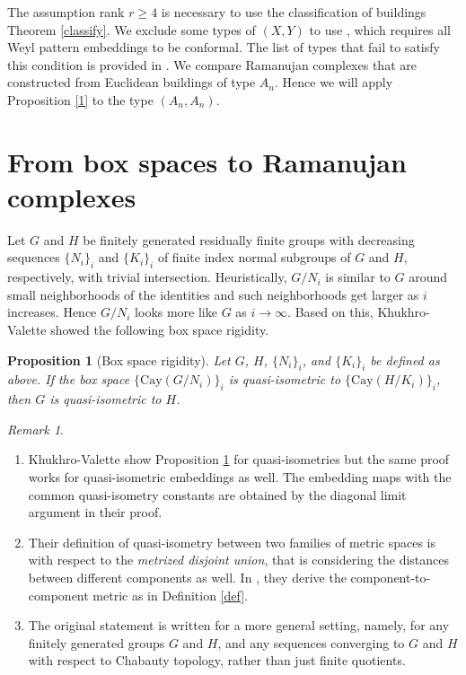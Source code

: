 \documentclass[letterpaper, reqno, 11pt]{amsart}
\newtheorem{prop}[theorem]{Proposition}
\theoremstyle{definition}
\theoremstyle{definition}
\theoremstyle{remark}
\newtheorem{Rmk}[theorem]{Remark}
\begin{document}
The assumption rank $r \geq 4$ is necessary to use the classification of buildings Theorem \ref{classify}. We exclude some types of $(X,Y)$ to use \cite[Proof of Theorem 1.8]{fisher2018quasi}, which requires all Weyl pattern embeddings to be conformal. The list of types that fail to satisfy this condition is provided in \cite[Corollary 1.10]{fisher2018quasi}. 
We compare Ramanujan complexes that are constructed from Euclidean buildings of type $A_n$. Hence we will apply Proposition \ref{1} to the type $(A_n,A_n)$.


\section{From box spaces to Ramanujan complexes} \label{ra}

Let $G$ and $H$ be finitely generated residually finite groups with decreasing sequences $\{N_i\}_i$ and $\{K_i\}_i$ of finite index normal subgroups of $G$ and $H$, respectively, with trivial intersection. 
Heuristically, $G/N_i$ is similar to $G$ around small neighborhoods of the identities and such neighborhoods get larger as $i$ increases.
Hence $G/N_i$ looks more like $G$ as $i \to \infty$. Based on this, Khukhro-Valette showed the following box space rigidity.


\begin{prop} [Box space rigidity] \cite [Proposition 16] {khukhro2017expanders} \label{KV}
    Let $G$, $H$, $\{N_i\}_i$,  and $\{K_i\}_i$ be defined as above. 
    If the box space $\{\mathrm{Cay}(G/N_i)\}_i$ is quasi-isometric to 
    $\{\mathrm{Cay}(H/K_i)\}_i$, then $G$ is quasi-isometric to $H$.
\end{prop}

\begin{Rmk} \label{KV2}
\begin{enumerate}
    \item Khukhro-Valette show Proposition \ref{KV} for quasi-isometries but the same proof works for quasi-isometric embeddings as well. The embedding maps with the common quasi-isometry constants are obtained by the diagonal limit argument in their proof. 

    \item Their definition of quasi-isometry between two families of metric spaces is with respect to the \textit{metrized disjoint union}, that is considering the distances between different components as well. In \cite [Lemma 3]{khukhro2017expanders}, they derive the component-to-component metric as in Definition \ref{def}.

    \item The original statement is written for a more general setting, namely, for any finitely generated groups $G$ and $H$, and any sequences converging to $G$ and $H$ with respect to Chabauty topology, rather than just finite quotients.

   
\end{enumerate}
\end{Rmk}
\end{document}
